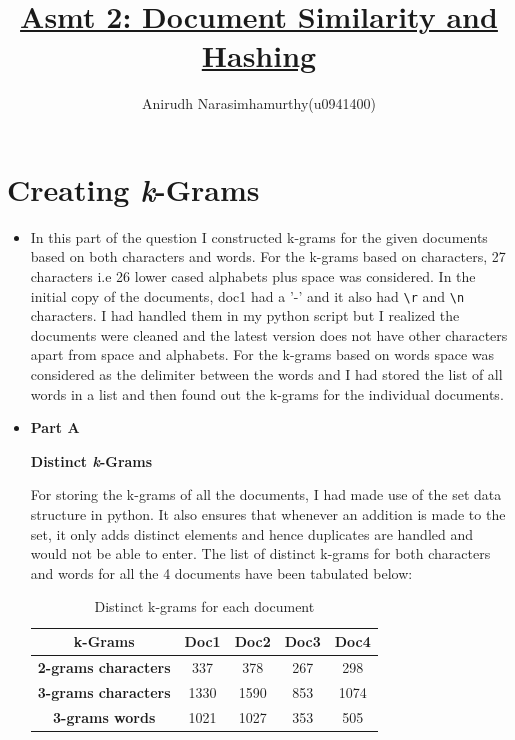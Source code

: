 \documentclass[11pt]{article}
\title{\textbf{\underline{Asmt 2: Document Similarity and  Hashing}}}
\author{Anirudh Narasimhamurthy(u0941400)}
\newcommand*{\escape}[1]{\texttt{\textbackslash#1}}
\begin{document}
\maketitle

\section{Creating \emph k-Grams}

\begin{itemize}
	
	
	\item[] In this part of the question I constructed k-grams for the given documents based on both characters and words. For the k-grams based on characters, 27 characters i.e 26 lower cased alphabets plus space was considered. In the initial copy of the documents, doc1 had a '-' and it also had \escape{r} and \escape{n} characters. I had handled them in my python script but I realized the documents were cleaned and the latest version does not have other characters apart from space and alphabets. For the k-grams based on words space was considered as the delimiter between the words and I had stored the list of all words in a list and then found out the k-grams for the individual documents.
	
	\item[] \textbf{Part A}

	\textbf{Distinct \emph{k}-Grams}

	For storing the k-grams of all the documents, I had made use of the set data structure in python. It also ensures that whenever an addition is made to the set, it only adds distinct elements and hence duplicates are handled and would not be able to enter. The list of distinct k-grams for both characters and words for all the 4 documents have been tabulated below:

	\begin{table}[h]
		\centering
		\begin{tabular}{|c|c|c|c|c|}
			\hline
			\textbf{k-Grams}  & \textbf{Doc1} & \textbf{Doc2} & \textbf{Doc3} & \textbf{Doc4}  \\
			\hline
			\textbf{2-grams characters} &  337   &  378     &  267     &  298  \\
			\hline
			\textbf{3-grams characters} &  1330    &  1590     &  853     &  1074     \\
			\hline
			\textbf{3-grams words}  &  1021    &  1027    &  353    &  505    \\
			\hline
		\end{tabular}
		\caption{Distinct k-grams for each document}
		\label{t2}
	\end{table}
	

\end{itemize}
\end{document}
